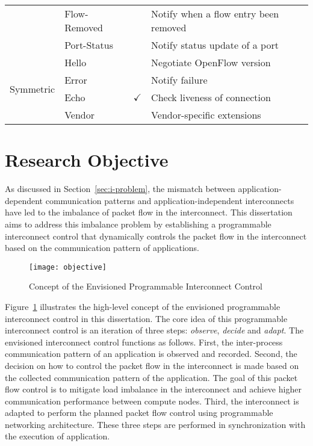 \begin{table}[t]
\begin{tabular}{@{}llcl@{}}
                            & Flow-Removed     &              & Notify when a flow entry been removed \\
                            & Port-Status      &              & Notify status update of a port        \\ \midrule
\multirow{4}{*}{Symmetric}  & Hello            &              & Negotiate OpenFlow version            \\
                            & Error            &              & Notify failure                        \\
                            & Echo             & $\checkmark$ & Check liveness of connection          \\
                            & Vendor           &              & Vendor-specific extensions            \\ \bottomrule
\end{tabular}
\end{table}

\clearpage

\section{Research Objective}\label{sec:i-objective}

As discussed in Section~\ref{sec:i-problem}, the mismatch between
application-dependent communication patterns and application-independent
interconnects have led to the imbalance of packet flow in the interconnect.
This dissertation aims to address this imbalance problem by establishing a
programmable interconnect control that dynamically controls the packet flow in
the interconnect based on the communication pattern of applications.

\begin{figure}
    \centering
    \texttt{[image: objective]}
    \caption{Concept of the Envisioned Programmable Interconnect Control}%
    \label{fig:objective}
\end{figure}

Figure~\ref{fig:objective} illustrates the high-level concept of the
envisioned programmable interconnect control in this dissertation. The core
idea of this programmable interconnect control is an iteration of three steps:
\emph{observe}, \emph{decide} and \emph{adapt}. The envisioned interconnect
control functions as follows. First, the inter-process communication pattern
of an application is observed and recorded. Second, the decision on how to
control the packet flow in the interconnect is made based on the collected
communication pattern of the application. The goal of this packet flow control
is to mitigate load imbalance in the interconnect and achieve higher
communication performance between compute nodes. Third, the interconnect is
adapted to perform the planned packet flow control using programmable
networking architecture. These three steps are performed in synchronization
with the execution of application.

